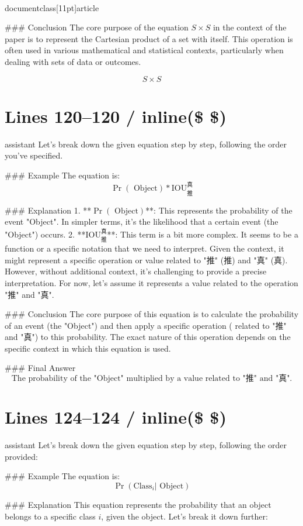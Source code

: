 \\documentclass[11pt]{article}
\begin{document}
### Conclusion
The core purpose of the equation \( S \times S \) in the context of the paper is to represent the Cartesian product of a set with itself. This operation is often used in various mathematical and statistical contexts, particularly when dealing with sets of data or outcomes.

\[
\boxed{S \times S}
\]

\section*{Lines 120–120 / inline(\$ \$) }
assistant
Let's break down the given equation step by step, following the order you've specified.

### Example
The equation is:
\[
\Pr(\textrm{ Object}) * \textrm{IOU}_{\textrm{推}}^{\textrm{真}}
\]

### Explanation
1. **\(\Pr(\textrm{ Object})\)**: This represents the probability of the event "Object". In simpler terms, it's the likelihood that a certain event (the "Object") occurs.
2. **\(\textrm{IOU}_{\textrm{推}}^{\textrm{真}}\)**: This term is a bit more complex. It seems to be a function or a specific notation that we need to interpret. Given the context, it might represent a specific operation or value related to "推" (推) and "真" (真). However, without additional context, it's challenging to provide a precise interpretation. For now, let's assume it represents a value related to the operation "推" and "真".

### Conclusion
The core purpose of this equation is to calculate the probability of an event (the "Object") and then apply a specific operation ( related to "推" and "真") to this probability. The exact nature of this operation depends on the specific context in which this equation is used.

### Final Answer
\[
\boxed{\text{The probability of the "Object" multiplied by a value related to "推" and "真".}}
\]

\section*{Lines 124–124 / inline(\$ \$) }
assistant
Let's break down the given equation step by step, following the order provided:

### Example
The equation is:
\[
\Pr(\textrm{Class}_i | \textrm{ Object})
\]

### Explanation
This equation represents the probability that an object belongs to a specific class \(i\), given the object. Let's break it down further:
\end{document}
